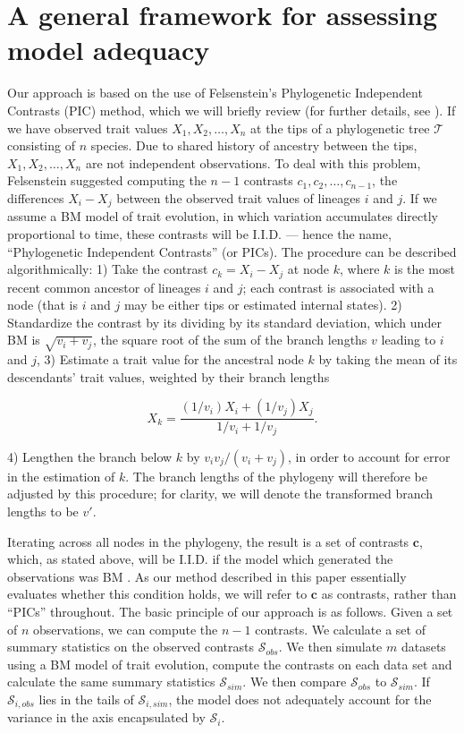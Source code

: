\documentclass[a4paper,12pt]{article}
\begin{document}
\section{A general framework for assessing model adequacy}
Our approach is based on the use of Felsenstein's \citep{Felsenstein1973, Felsenstein1985} Phylogenetic Independent Contrasts (PIC) method, which we will briefly review (for further details, see \citep{Felsenstein1985, Rohlf2001, Blomberg2012}). If we have observed trait values $X_1, X_2, \ldots, X_n$ at the tips of a phylogenetic tree $\mathcal{T}$ consisting of $n$ species. Due to shared history of ancestry between the tips, $X_1, X_2, \ldots, X_n$ are not independent observations. To deal with this problem, Felsenstein suggested computing the $n-1$ contrasts $c_1, c_2, \ldots, c_{n-1}$, the differences $X_{i} - X_{j}$ between the observed trait values of lineages $i$ and $j$. If we assume a BM model of trait evolution, in which variation accumulates directly proportional to time, these contrasts will be I.I.D. --- hence the name, ``Phylogenetic Independent Contrasts'' (or PICs). The procedure can be described algorithmically: 1) Take the contrast $c_k = X_i - X_j$ at node $k$, where $k$ is the most recent common ancestor of lineages $i$ and $j$; each contrast is associated with a node (that is $i$ and $j$ may be either tips or estimated internal states). 2) Standardize the contrast by its dividing by its standard deviation, which under BM is $\sqrt{v_i + v_j}$, the square root of the sum of the branch lengths $v$ leading to $i$ and $j$, 3) Estimate a trait value for the ancestral node $k$ by taking the mean of its descendants' trait values, weighted by their branch lengths

\begin{equation}
X_k = \frac{(1 / v_i)X_i + (1 / v_j)X_j}{1/v_i + 1/v_j}.
\end{equation}

4) Lengthen the branch below $k$ by $v_i v_j / (v_i + v_j)$, in order to account for error in the estimation of $k$. The branch lengths of the phylogeny will therefore be adjusted by this procedure; for clarity, we will denote the transformed branch lengths to be $v\prime$.

Iterating across all nodes in the phylogeny, the result is a set of contrasts $\mathbf{c}$, which, as stated above, will be I.I.D. if the model which generated the observations was BM \citep{Felsenstein1985, Rohlf2001}. As our method described in this paper essentially evaluates whether this condition holds, we will refer to $\mathbf{c}$ as contrasts, rather than ``PICs'' throughout. The basic principle of our approach is as follows. Given a set of $n$ observations, we can compute the $n-1$ contrasts. We calculate a set of summary statistics on the observed contrasts $\mathcal{S}_{obs}$. We then simulate $m$ datasets using a BM model of trait evolution, compute the contrasts on each data set and calculate the same summary statistics $\mathcal{S}_{sim}$. We then compare $\mathcal{S}_{obs}$ to $\mathcal{S}_{sim}$. If $\mathcal{S}_{i, obs}$ lies in the tails of $\mathcal{S}_{i, sim}$, the model does not adequately account for the variance in the axis encapsulated by $\mathcal{S}_i$.
\end{document}
